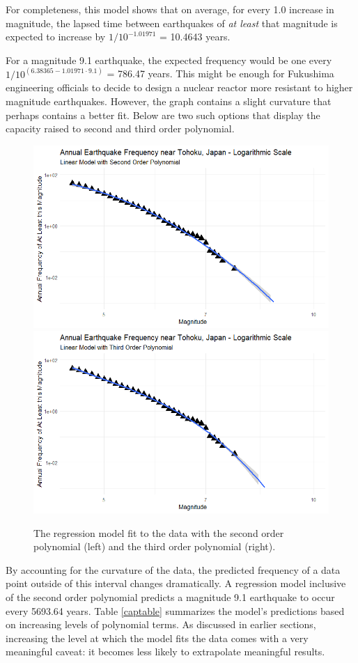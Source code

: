 For completeness, this model shows that on average, for every 1.0 increase in magnitude, the lapsed time between earthquakes of \emph{at least} that magnitude is expected to increase by \(1/10^{-1.01971}\) = 10.4643 years.

For a magnitude 9.1 earthquake, the expected frequency would be one
every \(1/10^{(6.38365 - 1.01971 \cdot 9.1)}\) = 786.47 years.  This might be enough for Fukushima engineering officials to decide to design a nuclear reactor more resistant to higher magnitude earthquakes.  However, the graph contains a slight curvature that perhaps contains a better fit.  Below are two such options that display the capacity raised to second and third order polynomial.

\begin{figure}[H]
    \includegraphics[width=0.5\linewidth]{Figures/tohoku_logscale_fit2.png}
    \includegraphics[width=0.5\linewidth]{Figures/tohoku_logscale_fit3.png}
    \caption{\footnotesize{The regression model fit to the data with the second order polynomial (left) and the third order polynomial (right).}}
    \label{tohoku_lm23}
\end{figure}

By accounting for the curvature of the data, the predicted frequency of a data point outside of this interval changes dramatically.  A regression model inclusive of the second order polynomial predicts a magnitude 9.1 earthquake to occur every 5693.64 years. %
Table \ref{captable} summarizes the model's predictions based on increasing levels of polynomial terms. As discussed in earlier sections, increasing the level at which the model fits the data comes with a very meaningful caveat: it becomes less likely to extrapolate meaningful results.

